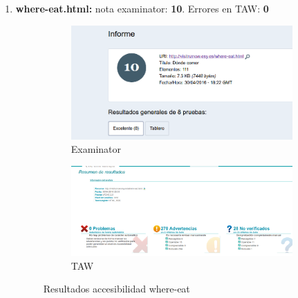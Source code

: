 \begin{enumerate}
	
	\item \textbf{where-eat.html: }nota examinator: \textbf{10}. Errores en TAW: \textbf{0}
	\begin{figure}
		\centering
		\begin{subfigure}{.5\textwidth}
			\centering
			\includegraphics[width=.8\linewidth]{./Fotos/exa-eat.png}
			\caption{Examinator}
			\label{fig: Examinator where-eat}
		\end{subfigure}%
		\begin{subfigure}{.5\textwidth}
			\centering
			\includegraphics[width=.8\linewidth]{./Fotos/taw-eat.png}
			\caption{TAW}
			\label{fig: TAW where-eat}
		\end{subfigure}
		\caption{Resultados accesibilidad where-eat}
		\label{fig:Resultados accesibilidad where-eat}
	\end{figure}
	

\end{enumerate}
